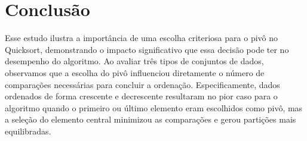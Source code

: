 \documentclass[12pt]{article}
\begin{document}
\section{Conclusão}
Esse estudo ilustra a importância de uma escolha criteriosa para o pivô no Quicksort, demonstrando o impacto significativo que essa decisão pode ter no desempenho do algoritmo. Ao avaliar três tipos de conjuntos de dados, observamos que a escolha do pivô influenciou diretamente o número de comparações necessárias para concluir a ordenação. Especificamente, dados ordenados de forma crescente e decrescente resultaram no pior caso para o algoritmo quando o primeiro ou último elemento eram escolhidos como pivô, mas a seleção do elemento central minimizou as comparações e gerou partições mais equilibradas.
\end{document}
